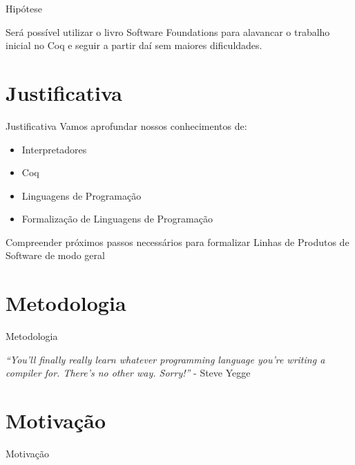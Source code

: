 \documentclass{beamer}
\begin{document}
	
	\begin{frame}{Hipótese}
		\begin{block}{}
			Será possível utilizar o livro Software Foundations para alavancar o trabalho inicial no Coq e seguir a partir daí sem maiores dificuldades.
		\end{block}
	\end{frame}
			
	\section{Justificativa}
	
	
	\begin{frame}{Justificativa}
		Vamos aprofundar nossos conhecimentos de:
		\begin{itemize}
			\item Interpretadores
			\item Coq
			\item Linguagens de Programação
			\item Formalização de Linguagens de Programação
		\end{itemize}    
		\begin{block}{}
			Compreender próximos passos necessários para formalizar Linhas de Produtos de Software de modo geral
		\end{block}
	\end{frame}

	
	\section{Metodologia}
	\begin{frame}{Metodologia}
		\centering
		\begin{block}{}
			\textit{``You'll finally really learn whatever programming language you're writing a compiler for. There's	no other way. Sorry!''} -  Steve Yegge
		\end{block}
	\end{frame}
	
	
	\section{Motivação}
	\begin{frame}{Motivação}
		\centering
		\scalebox{2}{Formalizar Haephestus}
	\end{frame}
	
	
\end{document}
